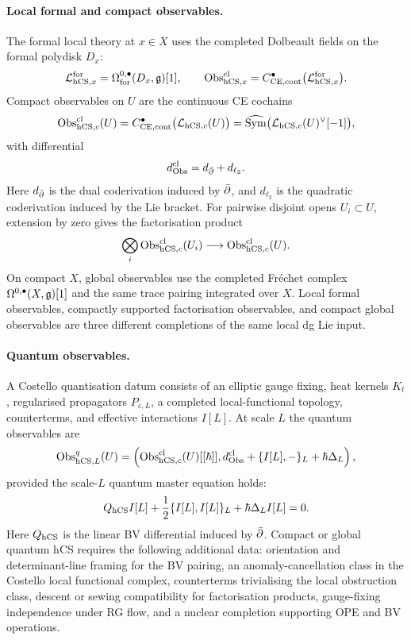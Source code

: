 \paragraph{Local formal and compact observables.}
The formal local theory at \(x\in X\) uses the completed Dolbeault
fields on the formal polydisk \(D_x\):
\[
  \mathcal L_{\mathrm{hCS},x}^{\mathrm{for}}
  =
  \Omega^{0,\bullet}_{\mathrm{for}}(D_x,\mathfrak g)[1],
  \qquad
  \mathrm{Obs}^{\mathrm{cl}}_{\mathrm{hCS},x}
  =
  C^\bullet_{\mathrm{CE},\mathrm{cont}}
  \bigl(\mathcal L_{\mathrm{hCS},x}^{\mathrm{for}}\bigr).
\]
Compact observables on \(U\) are the continuous CE cochains
\[
  \mathrm{Obs}^{\mathrm{cl}}_{\mathrm{hCS},c}(U)
  =
  C^\bullet_{\mathrm{CE},\mathrm{cont}}\bigl(\mathcal L_{\mathrm{hCS},c}(U)\bigr)
  =
  \widehat{\mathrm{Sym}}
  \bigl(\mathcal L_{\mathrm{hCS},c}(U)^\vee[-1]\bigr),
\]
with differential
\[
  d^{\mathrm{cl}}_{\mathrm{Obs}}=d_{\bar\partial}+d_{\ell_2}.
\]
Here \(d_{\bar\partial}\) is the dual coderivation induced by \(\bar\partial\), and
\(d_{\ell_2}\) is the quadratic coderivation induced by the Lie bracket.
For pairwise disjoint opens \(U_i\subset U\), extension by zero gives
the factorisation product
\[
  \bigotimes_i\mathrm{Obs}^{\mathrm{cl}}_{\mathrm{hCS},c}(U_i)
  \longrightarrow
  \mathrm{Obs}^{\mathrm{cl}}_{\mathrm{hCS},c}(U).
\]
On compact \(X\), global observables use the completed Fréchet complex
\(\Omega^{0,\bullet}(X,\mathfrak g)[1]\) and the same trace pairing integrated
over \(X\).  Local formal observables, compactly supported
factorisation observables, and compact global observables are three
different completions of the same local dg Lie input.

\paragraph{Quantum observables.}
A Costello quantisation datum consists of an elliptic gauge fixing,
heat kernels \(K_t\), regularised propagators \(P_{\varepsilon,L}\), a
completed local-functional topology, counterterms, and effective
interactions \(I[L]\).  At scale \(L\) the quantum observables are
\[
  \mathrm{Obs}^q_{\mathrm{hCS},L}(U)
  =
  \left(
    \mathrm{Obs}^{\mathrm{cl}}_{\mathrm{hCS},c}(U)[[\hbar]],
    d^{\mathrm{cl}}_{\mathrm{Obs}}+\{I[L],-\}_L+\hbar\Delta_L
  \right),
\]
provided the scale-\(L\) quantum master equation holds:
\[
  Q_{\mathrm{hCS}}I[L]
  +\frac12\{I[L],I[L]\}_L
  +\hbar\Delta_LI[L]
  =
  0.
\]
Here \(Q_{\mathrm{hCS}}\) is the linear BV differential induced by \(\bar\partial\).
Compact or global quantum hCS requires the following additional data:
orientation and determinant-line framing for the BV pairing, an
anomaly-cancellation class in the Costello local functional complex,
counterterms trivialising the local obstruction class, descent or sewing
compatibility for factorisation products, gauge-fixing independence
under RG flow, and a nuclear completion supporting OPE and BV
operations.

